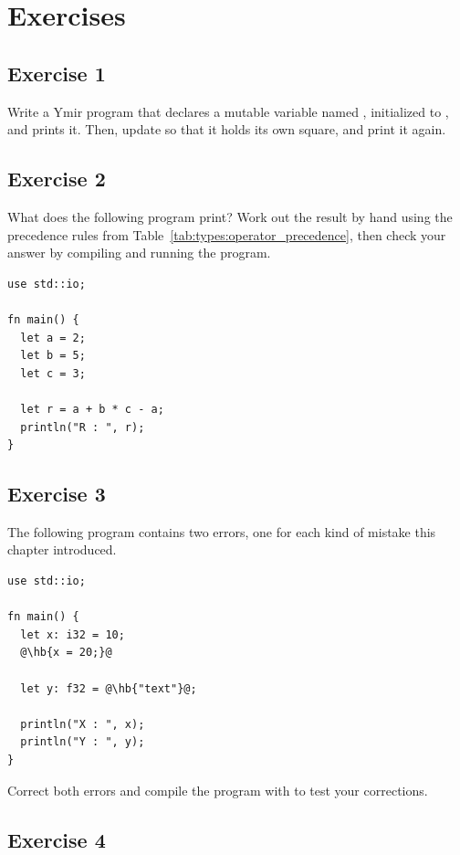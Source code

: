 \vfill%
\pagebreak

\section*{Exercises}
%
\subsection*{Exercise 1}

Write a Ymir program that declares a mutable  variable named
, initialized to , and prints it. Then, update
 so that it holds its own square, and print it again.

\subsection*{Exercise 2}

What does the following program print? Work out the result by hand using the
precedence rules from Table~\ref{tab:types:operator_precedence}, then check
your answer by compiling and running the program.

\begin{lstlisting}[style=coloredverbatim]
use std::io;

fn main() {
  let a = 2;
  let b = 5;
  let c = 3;

  let r = a + b * c - a;
  println("R : ", r);
}
\end{lstlisting}

\subsection*{Exercise 3}

The following program contains two errors, one for each kind of mistake this
chapter introduced.

\begin{lstlisting}[style=coloredverbatimError, escapechar=@, caption=Ymir program with errors]
use std::io;

fn main() {
  let x: i32 = 10;
  @\hb{x = 20;}@

  let y: f32 = @\hb{"text"}@;

  println("X : ", x);
  println("Y : ", y);
}
\end{lstlisting}

Correct both errors and compile the program with  to test your
corrections.

\subsection*{Exercise 4}

